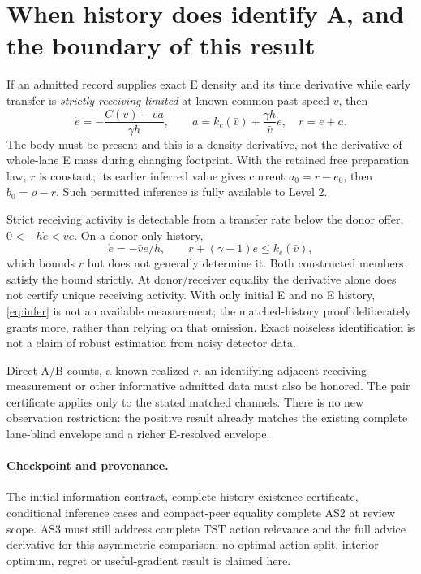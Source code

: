 \documentclass[11pt,a4paper]{article}
\newcommand{\kc}{k_c}
\begin{document}
\section{When history does identify A, and the boundary of this result}
If an admitted record supplies exact E density and its time derivative
while early transfer is \emph{strictly receiving-limited} at known common
past speed $\bar v$, then
\begin{equation}
 \dot e=-\frac{C(\bar v)-\bar va}{\gamma h},\qquad
 a=\kc(\bar v)+\frac{\gamma h}{\bar v}\dot e,
 \quad r=e+a.
 \label{eq:infer}
\end{equation}
The body must be present and this is a density derivative, not the
derivative of whole-lane E mass during changing footprint. With the retained
free preparation law, $r$ is constant; its earlier inferred value gives
current $a_0=r-e_0$, then $b_0=\rho-r$. Such permitted inference is fully
available to Level 2.

Strict receiving activity is detectable from a transfer rate below the
donor offer, $0<-h\dot e<\bar ve$. On a donor-only history,
\begin{equation}
 \dot e=-\bar ve/h,\qquad
 r+(\gamma-1)e\leq\kc(\bar v),
 \label{eq:donorbound}
\end{equation}
which bounds $r$ but does not generally determine it. Both constructed
members satisfy the bound strictly. At donor/receiver equality the
derivative alone does not certify unique receiving activity. With only
initial E and no E history, \eqref{eq:infer} is not an available measurement;
the matched-history proof deliberately grants more, rather than relying on
that omission. Exact noiseless identification is not a claim of robust
estimation from noisy detector data.

Direct A/B counts, a known realized $r$, an identifying adjacent-receiving
measurement or other informative admitted data must also be honored. The
pair certificate applies only to the stated matched channels. There is no
new observation restriction: the positive result already matches the
existing complete lane-blind envelope and a richer E-resolved envelope.

\paragraph{Checkpoint and provenance.}
The initial-information contract, complete-history existence certificate,
conditional inference cases and compact-peer equality complete AS2 at
review scope. AS3 must still address complete TST action relevance and the
full advice derivative for this asymmetric comparison; no optimal-action
split, interior optimum, regret or useful-gradient result is claimed here.
\end{document}
